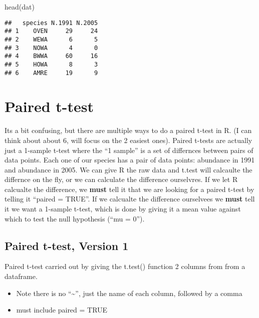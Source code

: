 \documentclass[
]{book}
\newenvironment{Shaded}{\begin{snugshade}}{\end{snugshade}}
\newcommand{\AttributeTok}[1]{\textcolor[rgb]{0.77,0.63,0.00}{#1}}
\newcommand{\CommentTok}[1]{\textcolor[rgb]{0.56,0.35,0.01}{\textit{#1}}}
\newcommand{\ConstantTok}[1]{\textcolor[rgb]{0.00,0.00,0.00}{#1}}
\newcommand{\FloatTok}[1]{\textcolor[rgb]{0.00,0.00,0.81}{#1}}
\newcommand{\FunctionTok}[1]{\textcolor[rgb]{0.00,0.00,0.00}{#1}}
\newcommand{\NormalTok}[1]{#1}
\newcommand{\SpecialCharTok}[1]{\textcolor[rgb]{0.00,0.00,0.00}{#1}}
\providecommand{\tightlist}{%
  \setlength{\itemsep}{0pt}\setlength{\parskip}{0pt}}
\begin{document}
\begin{Shaded}
\begin{Highlighting}[]
\FunctionTok{head}\NormalTok{(dat)}
\end{Highlighting}
\end{Shaded}

\begin{verbatim}
##   species N.1991 N.2005
## 1    OVEN     29     24
## 2    WEWA      6      5
## 3    NOWA      4      0
## 4    BWWA     60     16
## 5    HOWA      8      3
## 6    AMRE     19      9
\end{verbatim}

\hypertarget{paired-t-test}{%
\section{Paired t-test}\label{paired-t-test}}

Its a bit confusing, but there are multiple ways to do a paired t-test in R. (I can think about about 6, will focus on the 2 easiest ones). Paired t-tests are actually just a 1-sample t-test where the ``1 sample'' is a set of differnces between pairs of data points. Each one of our species has a pair of data points: abundance in 1991 and abundance in 2005. We can give R the raw data and t.test will calcaulte the differnce on the fly, or we can calculate the difference ourselvres. If we let R calcualte the difference, we \textbf{must} tell it that we are looking for a paired t-test by telling it ``paired = TRUE''. If we calcualte the difference ourselvees we \textbf{must} tell it we want a 1-sample t-test, which is done by giving it a mean value against which to test the null hypothesis (``mu = 0'').

\hypertarget{paired-t-test-version-1}{%
\subsection{Paired t-test, Version 1}\label{paired-t-test-version-1}}

Paired t-test carried out by giving the t.test() function 2 columns from from a dataframe.

\begin{itemize}
\tightlist
\item
  Note there is no ``\textasciitilde{}'', just the name of each column, followed by a comma
\item
  must include paired = TRUE
\end{itemize}

\begin{Shaded}
\end{Shaded}
\end{document}
